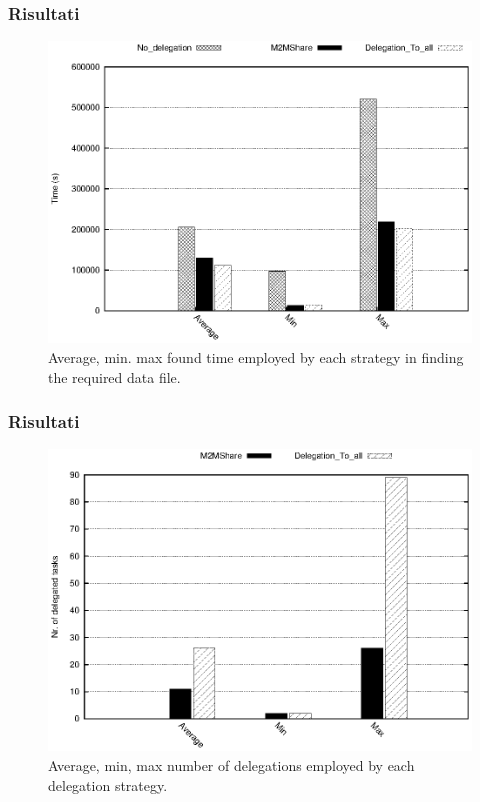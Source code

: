 \documentclass{beamer}
\begin{document}
\begin{frame}
\frametitle{Risultati}
\begin{center}
\begin{figure}[ht]
\includegraphics[scale=0.7]{../grafici/tempi.eps}
\caption{Average, min. max found time employed by each strategy in finding the required data file.}
\end{figure}
\end{center}
\end{frame}

\begin{frame}
\frametitle{Risultati}
\begin{center}
\begin{figure}[ht]
\includegraphics[scale=0.7]{../grafici/delegheFatte.eps}
\caption{Average, min, max number of delegations employed by each delegation strategy.}
\end{figure}
\end{center}
\end{frame}
\end{document}

